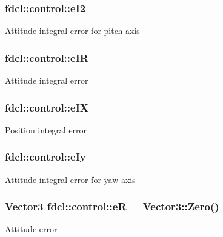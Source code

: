 \subsubsection[{\texorpdfstring{e\+I2}{eI2}}]{ fdcl\+::control\+::e\+I2}\hypertarget{classfdcl_1_1control_aaae1fb8260741f98f50009d4205b940e}{}\label{classfdcl_1_1control_aaae1fb8260741f98f50009d4205b940e}
Attitude integral error for pitch axis 
\subsubsection[{\texorpdfstring{e\+IR}{eIR}}]{ fdcl\+::control\+::e\+IR}\hypertarget{classfdcl_1_1control_ab59f7fd938d291ec387a820eb766a2a5}{}\label{classfdcl_1_1control_ab59f7fd938d291ec387a820eb766a2a5}
Attitude integral error 
\subsubsection[{\texorpdfstring{e\+IX}{eIX}}]{ fdcl\+::control\+::e\+IX}\hypertarget{classfdcl_1_1control_a2d7453277a587c8c9b556505f3e3958c}{}\label{classfdcl_1_1control_a2d7453277a587c8c9b556505f3e3958c}
Position integral error 
\subsubsection[{\texorpdfstring{e\+Iy}{eIy}}]{ fdcl\+::control\+::e\+Iy}\hypertarget{classfdcl_1_1control_a1d33b4d53f99c73983fdbe70ce506ce8}{}\label{classfdcl_1_1control_a1d33b4d53f99c73983fdbe70ce506ce8}
Attitude integral error for yaw axis 
\subsubsection[{\texorpdfstring{eR}{eR}}]{\setlength{\rightskip}{0pt plus 5cm}Vector3 fdcl\+::control\+::eR = Vector3\+::\+Zero()}\hypertarget{classfdcl_1_1control_af3d563b76ffba90a299349b0968d2b1e}{}\label{classfdcl_1_1control_af3d563b76ffba90a299349b0968d2b1e}
Attitude error 
